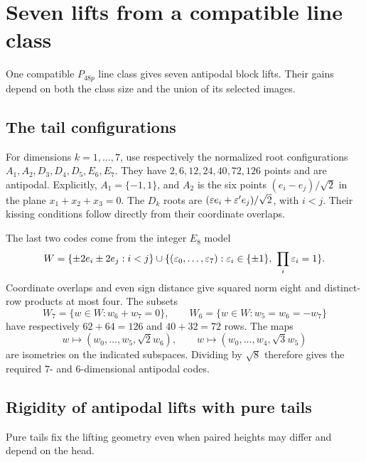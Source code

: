 \section{Seven lifts from a compatible line class}\label{app:p48}

One compatible $P_{48p}$ line class gives seven antipodal block lifts.
Their gains depend on both the class size and the union of its selected images.

\subsection{The tail configurations}
For dimensions $k=1,\ldots,7$, use respectively the normalized root
configurations
$A_1,A_2,D_3,D_4,D_5,E_6,E_7$. They have
$2,6,12,24,40,72,126$ points and are antipodal. Explicitly,
$A_1=\{-1,1\}$, and $A_2$ is the six points
$(e_i-e_j)/\sqrt2$ in the plane $x_1+x_2+x_3=0$. The $D_k$ roots
are $(\varepsilon e_i+\varepsilon'e_j)/\sqrt2$, with $i<j$. Their kissing
conditions follow directly from their coordinate overlaps.

The last two codes come from the integer $E_8$ model
\begin{equation}\label{eq:E8}
 W=\{\pm2e_i\pm2e_j:i<j\}
  \cup\{(\eps_0,\ldots,\eps_7):\eps_i\in\{\pm1\},\ \prod_i\eps_i=1\}.
\end{equation}
Coordinate overlaps and even sign distance give squared norm eight
and distinct-row products at most four. The subsets
\[
 W_7=\{w\in W:w_6+w_7=0\},\qquad
 W_6=\{w\in W:w_5=w_6=-w_7\}
\]
have respectively $62+64=126$ and $40+32=72$ rows. The maps
\[
 w\longmapsto(w_0,\ldots,w_5,\sqrt2w_6),\qquad
 w\longmapsto(w_0,\ldots,w_4,\sqrt3w_5)
\]
are isometries on the indicated subspaces. Dividing by $\sqrt8$
therefore gives the required $7$- and $6$-dimensional antipodal codes.

\subsection{Rigidity of antipodal lifts with pure tails}
Pure tails fix the lifting geometry even when paired heights may differ
and depend on the head.

